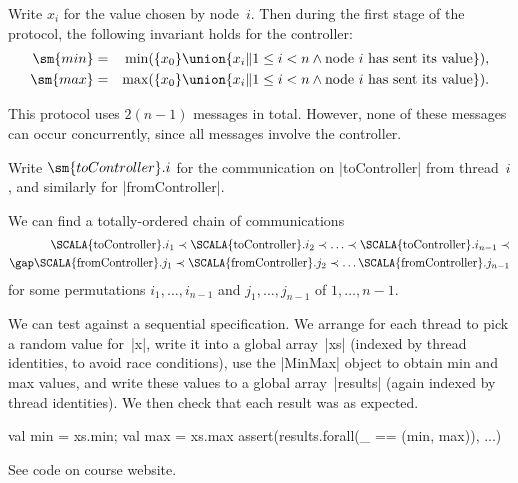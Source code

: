 \documentclass[notes,color]{sepslide0}
\def\set#1{\{#1\}}
\begin{document}

\begin{slide}

Write $x_i$ for the value chosen by node~$i$.  Then during the first stage of
the protocol, the following invariant holds for the controller:
%
\begin{eqnarray*}
\sm{min} & = & 
   \min(\set{x_0} \union 
    \set{x_i \| 1 \le i < n \land  \mbox{node~$i$ has sent its value}}),
\\
\sm{max} & = & 
   \max(\set{x_0} \union 
   \set{x_i \| 1 \le i < n \land \mbox{node~$i$ has sent its value}}).
\end{eqnarray*}
\end{slide}


\begin{slide}

This protocol uses $2(n-1)$ messages in total.  However, none of these
messages can occur concurrently, since all messages involve the
controller.

Write $\sm{toController}.i$ for the communication on |toController| from
thread~$i$, and similarly for |fromController|.

We can find a totally-ordered chain of communications
\[
\begin{align}
\mbox{\SCALA{toController}}.i_1 \prec \mbox{\SCALA{toController}}.i_2 
  \prec \ldots  \prec \mbox{\SCALA{toController}}.i_{n-1} \prec \\
\gap
  \mbox{\SCALA{fromController}}.j_1 \prec \mbox{\SCALA{fromController}}.j_2 
  \prec \ldots \mbox{\SCALA{fromController}}.j_{n-1}
\end{align}
\]
for some permutations $i_1, \ldots, i_{n-1}$ and $j_1, \ldots, j_{n-1}$ of $1,
\ldots, n-1$. 
\end{slide}


\begin{slide}

We can test against a sequential specification.  We arrange for each thread to
pick a random value for~|x|, write it into a global array~|xs| (indexed by
thread identities, to avoid race conditions), use the |MinMax| object to
obtain min and max values, and write these values to a global
array~|results| (again indexed by thread identities).  We then check that each
result was as expected.
\begin{scala}
  val min = xs.min; val max = xs.max
  assert(results.forall(_ == (min, max)), ...)
\end{scala}

See code on course website.
\end{slide}
\end{document}
